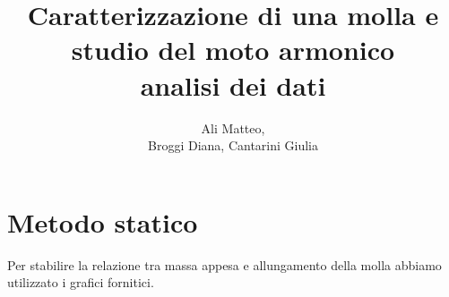 \documentclass[a4paper]{article}
\title{Caratterizzazione di una molla e studio del moto armonico\\ analisi dei dati}
\author{Ali Matteo,\\Broggi Diana, Cantarini Giulia}
\date{ }
\theoremstyle{definition}
\begin{document}
	\maketitle
	
\section*{Metodo statico}
Per stabilire la relazione tra massa appesa e allungamento della molla  abbiamo utilizzato i grafici fornitici.	
\begin{figure}[!htbp]
\end{figure}
\end{document}
